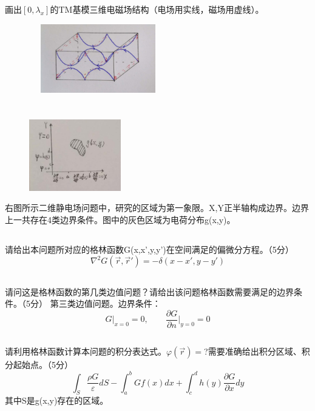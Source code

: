 \documentclass[UTF8]{ctexart}
\begin{document}
\subsection{}
画出$[0,\lambda_x]$的TM基模三维电磁场结构（电场用实线，磁场用虚线）。
\begin{figure}[H]
\centering
\includegraphics[width=6cm,height=3cm]{2016-4.jpg}
\end{figure}
\section{}
\begin{figure}
\includegraphics[width=4cm]{2016-5.jpg}
\end{figure}
右图所示二维静电场问题中，研究的区域为第一象限。X,Y正半轴构成边界。边界上一共存在4类边界条件。图中的灰色区域为电荷分布g(x,y)。
\subsection{}
请给出本问题所对应的格林函数G(x,x',y,y')在空间满足的偏微分方程。（5分）
\[\nabla^2G(\vec r,\vec r')=-\delta(x-x',y-y')\]
\subsection{}
请问这是格林函数的第几类边值问题？请给出该问题格林函数需要满足的边界条件。（5分）
第三类边值问题。边界条件：
\[G\lvert_{x=0}=0,\quad\quad\frac{\partial G}{\partial n}\lvert_{y=0}=0\]
\subsection{}
请利用格林函数计算本问题的积分表达式。$\varphi(\vec r)=$?需要准确给出积分区域、积分起始点。（5分）
\[\int_S^{}{\frac{\rho G}{\varepsilon}dS}-\int_a^b{Gf(x)dx}+\int_c^d{h(y)\frac{\partial G}{\partial x}dy}\]
其中S是g(x,y)存在的区域。
\end{document}
